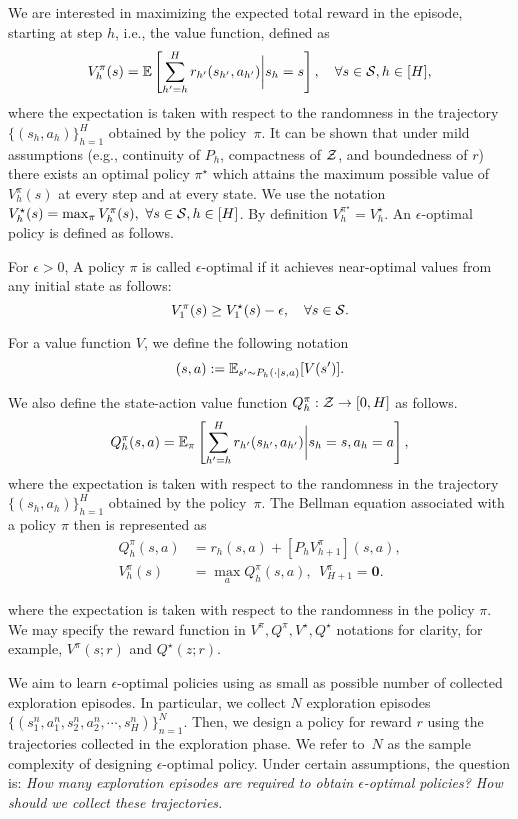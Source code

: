 \documentclass{article}
\begin{document}
We are interested in maximizing the expected total reward in the episode, starting at step $h$, i.e., the value function, defined as
\begin{equation}
V^{\pi}_h(s) = \mathbb{E}\left[\sum_{h'=h}^Hr_{h'}(s_{h'},a_{h'})\bigg|s_{h}=s\right],  ~~~\forall s\in\mathcal{S}, h\in[H],
\end{equation}
where the expectation is taken with respect to the randomness in the trajectory $\{(s_h,a_h)\}_{h=1}^H$ obtained by the policy~$\pi$. It can be shown that under mild assumptions (e.g., continuity of $P_h$, compactness of $\mathcal{Z}$, and boundedness of $r$) there exists an optimal policy $\pi^{\star}$ which attains the maximum possible value of $V^{\pi}_{h}(s)$ at every step and at every state. We use the notation
$
V_{h}^{\star}(s) = \max_{\pi}V_h^{\pi}(s), ~\forall s\in\mathcal{S}, h\in[H]
$.
By definition $V^{\pi^{\star}}_h=V_{h}^{\star}$.
An $\epsilon$-optimal policy is defined as follows. 

For $\epsilon>0$, A policy $\pi$ is called $\epsilon$-optimal if it achieves near-optimal values from any initial state as follows:
\[
V_1^{\pi}(s) \geq V_1^{\star}(s) - \epsilon, \quad \forall s \in \mathcal{S}.
\]


For a value function $V$, we define the following notation
\begin{equation}
    [P_hV](s,a) := \E_{s'\sim P_h(\cdot|s,a)}[V(s')].  
\end{equation}

We also define the state-action value function $Q^{\pi}_h:\mathcal{Z}\rightarrow [0,H]$ as follows.
\begin{equation}
Q_h^{\pi}(s,a) = \mathbb{E}_{\pi}\left[
\sum_{h'=h}^Hr_{h'}(s_{h'},a_{h'})\bigg|s_h=s, a_h=a
\right],
\end{equation}
where the expectation is taken with respect to the randomness in the trajectory $\{(s_h,a_h)\}_{h=1}^H$ obtained by the policy~$\pi$.
The Bellman equation associated with a policy $\pi$ then is represented as
\begin{align*}
Q_h^{\pi}(s,a) &= r_h(s,a) + [P_hV^{\pi}_{h+1}](s,a), \\
V_h^{\pi}(s) &= \max_{a}Q_h^{\pi}(s,a),~~
V_{H+1}^{\pi} = \bm{0}.
\end{align*}

where the expectation is taken with respect to the randomness in the policy $\pi$. 
We may specify the reward function in $V^{\pi}, Q^{\pi}, V^{\star}, Q^{\star}$ notations for clarity, for example, $V^{\pi}(s;r)$ and $Q^{\star}(z;r)$. 


We aim to learn $\epsilon$-optimal policies using as small as possible number of collected exploration episodes. 
In particular, we collect
$N$ exploration episodes $\{(s_1^n,a_1^n, s_2^n, a_2^n, \cdots, s_{H}^n)\}_{n=1}^N$. Then, we design a policy for reward $r$ using the trajectories collected in the exploration phase. We refer to~$N$ as the sample complexity of designing $\epsilon$-optimal policy. Under certain assumptions, the question is: \emph{How many exploration episodes are required to obtain $\epsilon$-optimal policies? How should we collect these trajectories.}
\end{document}
